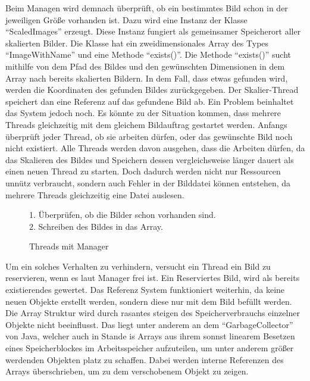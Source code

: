 Beim Managen wird demnach überprüft, ob ein bestimmtes Bild schon in der jeweiligen Größe vorhanden ist. Dazu wird eine Instanz der Klasse ``ScaledImages'' erzeugt. Diese Instanz fungiert als gemeinsamer Speicherort aller skalierten Bilder. Die Klasse hat ein zweidimensionales Array des Types ``ImageWithName'' und eine Methode ``exists()''. Die Methode ``exists()'' sucht mithilfe von dem Pfad des Bildes und den gewünschten Dimensionen in dem Array nach bereits skalierten Bildern. In dem Fall, dass etwas gefunden wird, werden die Koordinaten des gefunden Bildes zurückgegeben. Der Skalier-Thread speichert dan eine Referenz auf das gefundene Bild ab.
\medskip
\newline
Ein Problem beinhaltet das System jedoch noch. Es könnte zu der Situation kommen, dass mehrere Threads gleichzeitig mit dem gleichem Bildauftrag gestartet werden. Anfangs überprüft jeder Thread, ob sie arbeiten dürfen, oder das gewünschte Bild noch nicht existiert. Alle Threads werden davon ausgehen, dass die Arbeiten dürfen, da das Skalieren des Bildes und Speichern dessen vergleichsweise länger dauert als einen neuen Thread zu starten. Doch dadurch werden nicht nur Ressourcen unnütz verbraucht, sondern auch Fehler in der Bilddatei können entstehen, da mehrere Threads gleichzeitig eine Datei auslesen.

\begin{figure}[h]
    \centering
    \begin{minipage}{89mm}
        \fontsize{10pt}{11pt}\selectfont
        \def\svgwidth{8cm}
        
    \end{minipage}
    \begin{minipage}{1\textwidth-91mm}
        1. Überprüfen, ob die Bilder schon vorhanden sind.\\
        2. Schreiben des Bildes in das Array.
    \end{minipage}
    \caption[Thread und Manager]{Threads mit Manager}
\end{figure}

Um ein solches Verhalten zu verhindern, versucht ein Thread ein Bild zu reservieren, wenn es laut Manager frei ist. Ein Reserviertes Bild, wird als bereits existierendes gewertet. Das Referenz System funktioniert weiterhin, da keine neuen Objekte erstellt werden, sondern diese nur mit dem Bild befüllt werden. Die Array Struktur wird durch rasantes steigen des Speicherverbrauchs einzelner Objekte nicht beeinflusst. Das liegt unter anderem an dem ``GarbageCollector'' von Java, welcher auch in Stande is Arrays aus ihrem sonnst linearem Besetzen eines Speicherblockes im Arbeitsspeicher aufzuteilen, um unter anderem größer werdenden Objekten platz zu schaffen. Dabei werden interne Referenzen des Arrays überschrieben, um zu dem verschobenem Objekt zu zeigen.


